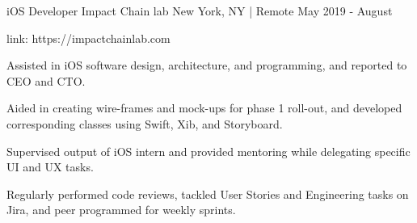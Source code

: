 \begin{cventries}

  \cventry
    {iOS Developer} %
    {Impact Chain lab} %
    {New York, NY | Remote} %
    {May 2019 - August} %
    {
      \begin{cvitems} %
        \item {link: https://impactchainlab.com}
        \item {Assisted in iOS software design, architecture, and programming, and  reported to CEO and CTO.}
        \item {Aided in creating wire-frames and mock-ups for phase 1 roll-out, and developed corresponding classes using Swift, Xib, and Storyboard.}
        \item {Supervised output of iOS intern and provided mentoring while delegating specific UI and UX tasks.}
        \item {Regularly performed code reviews, tackled User Stories and Engineering tasks on Jira, and peer programmed for weekly sprints.}
      \end{cvitems}
    }
    
\end{cventries}

